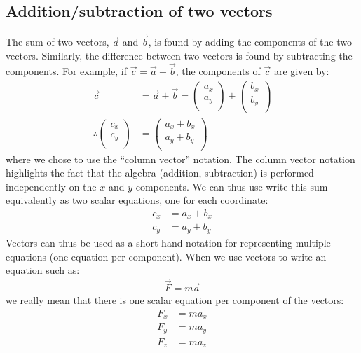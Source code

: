 \subsection{Addition/subtraction of two vectors}
The sum of two vectors, $\vec a$ and $\vec b$, is found by adding the components of the two vectors. Similarly, the difference between two vectors is found by subtracting the components. For example, if $\vec c=\vec a+\vec b$, the components of $\vec c$ are given by:
\begin{align*}
\vec c &= \vec a + \vec b = \begin{pmatrix}
           a_x \\
           a_y \\
         \end{pmatrix} + \begin{pmatrix}
           b_x \\
           b_y \\
         \end{pmatrix}\\
        \therefore \begin{pmatrix}
           c_x \\
           c_y \\
         \end{pmatrix} &=\begin{pmatrix}
           a_x+b_x \\
           a_y+b_y \\
         \end{pmatrix}
\end{align*}
where we chose to use the ``column vector'' notation. The column vector notation highlights the fact that the algebra (addition, subtraction) is performed independently on the $x$ and $y$ components. We can thus use write this sum equivalently as two scalar equations, one for each coordinate:
\begin{align*}
c_x &= a_x+b_x\\
c_y &= a_y+b_y
\end{align*}
Vectors can thus be used as a short-hand notation for representing multiple equations (one equation per component). When we use vectors to write an equation such as:
\begin{align*}
\vec F = m\vec a
\end{align*}
we really mean that there is one scalar equation per component of the vectors:
\begin{align*}
F_x &= ma_x\\
F_y &= ma_y\\
F_z &= ma_z
\end{align*}

